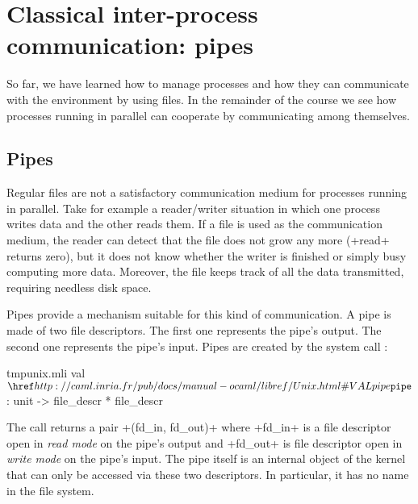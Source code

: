 %
%

\chapter{\label{sec/pipes}Classical inter-process communication: pipes}

So far, we have learned how to manage processes and how they can communicate
with the environment by using files. In the remainder of the
course we see how processes running in parallel can cooperate by
communicating among themselves.

\section{Pipes}

Regular files are not a satisfactory communication medium for processes
running in parallel. Take for example a reader/writer situation in
which one process writes data and the other reads them. If a file is used
as the communication medium, the reader can detect that the file
does not grow any more (\ml+read+ returns zero), but it does not know
whether the writer is finished or simply busy computing
more data. Moreover, the file keeps track of all the data transmitted,
requiring needless disk space.

Pipes provide a mechanism suitable for this kind of communication. A
pipe is made of two file descriptors. The first one
represents the pipe's output. The second one represents
the pipe's input. Pipes are created by the system call
:
%
\begin{listingcodefile}{tmpunix.mli}
val $\libvalue{Unix}{pipe}$ : unit -> file_descr * file_descr
\end{listingcodefile}
%
The call returns a pair \ml+(fd_in, fd_out)+ where \ml+fd_in+ is a
file descriptor open in \emph{read mode} on the pipe's output and
\ml+fd_out+ is file descriptor open in \emph{write mode} on the pipe's
input. The pipe itself is an internal object of the kernel that can
only be accessed via these two descriptors. In particular, it has no
name in the file system.

